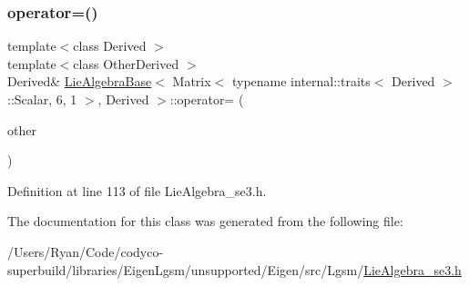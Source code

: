 \subsubsection{\texorpdfstring{operator=()}{operator=()}\hspace{0.1cm}{\footnotesize\ttfamily [3/3]}}
{\footnotesize\ttfamily template$<$class Derived $>$ \\
template$<$class Other\+Derived $>$ \\
Derived\& \hyperlink{class_lie_algebra_base}{Lie\+Algebra\+Base}$<$ Matrix$<$ typename internal\+::traits$<$ Derived $>$\+::Scalar, 6, 1 $>$, Derived $>$\+::operator= (\begin{DoxyParamCaption}\item[{const Matrix\+Base$<$ Other\+Derived $>$ \&}]{other }\end{DoxyParamCaption})\hspace{0.3cm}{\ttfamily [inline]}}



Definition at line 113 of file Lie\+Algebra\+\_\+se3.\+h.



The documentation for this class was generated from the following file\+:\begin{DoxyCompactItemize}
\item 
/\+Users/\+Ryan/\+Code/codyco-\/superbuild/libraries/\+Eigen\+Lgsm/unsupported/\+Eigen/src/\+Lgsm/\hyperlink{_lie_algebra__se3_8h}{Lie\+Algebra\+\_\+se3.\+h}\end{DoxyCompactItemize}
